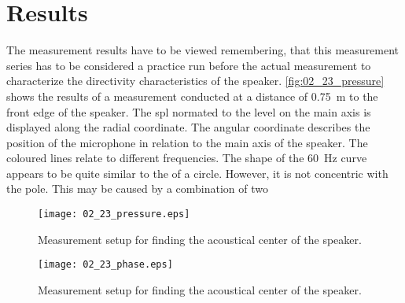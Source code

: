 \section*{Results}
The measurement results have to be viewed remembering, that this measurement series has to be considered a practice run before the actual measurement to characterize the directivity characteristics of the speaker. \autoref{fig:02_23_pressure} shows the results of a measurement conducted at a distance of \SI{0.75}{\meter} to the front edge of the speaker. The \gls{spl} normated to the level on the main axis is displayed along the radial coordinate. The angular coordinate describes the position of the microphone in relation to the main axis of the speaker. The coloured lines relate to different frequencies.
The shape of the \SI{60}{\hertz} curve appears to be quite similar to the of a circle. However, it is not concentric with the pole. This may be caused by a combination of two 
\begin{figure}[htbp]
	\centering
	\texttt{[image: 02\_23\_pressure.eps]}
	\caption{Measurement setup for finding the acoustical center of the speaker.}
		\label{fig:02_23_pressure}
\end{figure}

\begin{figure}[htbp]
	\centering
	\texttt{[image: 02\_23\_phase.eps]}
	\caption{Measurement setup for finding the acoustical center of the speaker.}
		\label{fig:02_23_phase}
\end{figure}
